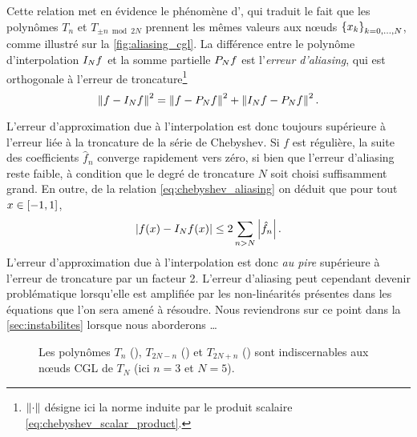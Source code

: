 Cette relation met en évidence le phénomène d', qui traduit le fait que les polynômes $T_n$ et $T_{\pm n \bmod{2N}}$ prennent les mêmes valeurs aux n\oe uds $\family{x}{k}{0}{N}$, comme illustré sur la \autoref{fig:aliasing_cgl}.
La différence entre le polynôme d'interpolation $\interpolant{f}{N}$ et la somme partielle $\truncseries{f}{N}$ est l'\textit{erreur d'aliasing}, qui est orthogonale à l'erreur de troncature\footnote{$\normtwo{\cdot}$ désigne ici la norme induite par le produit scalaire \eqref{eq:chebyshev_scalar_product}.}
\begin{equation}
	\normtwo{f - \interpolant{f}{N}}^2 = 
	\normtwo{f - \truncseries{f}{N}}^2 + 
	\normtwo{\interpolant{f}{N} - \truncseries{f}{N}}^2.
	\label{eq:chebyshev_aliasing_esrror}
\end{equation}

L'erreur d'approximation due à l'interpolation est donc toujours supérieure à l'erreur liée à la troncature de la série de Chebyshev.
Si $f$ est régulière, la suite des coefficients $\hat{f}_n$ converge rapidement vers zéro, si bien que l'erreur d'aliasing reste faible, à condition que le degré de troncature $N$ soit choisi suffisamment grand.
En outre, de la relation \eqref{eq:chebyshev_aliasing} on déduit que pour tout $x \in \chebinterval$,
\begin{equation}
	\left| f(x) - \interpolant{f}{N}(x) \right| \leq 2 \sum_{n>N} \left| \hat{f}_n \right|.
\end{equation}
L'erreur d'approximation due à l'interpolation est donc \textit{au pire} supérieure à l'erreur de troncature par un facteur 2.
L'erreur d'aliasing peut cependant devenir problématique lorsqu'elle est amplifiée par les non-linéarités présentes dans les équations que l'on sera amené à résoudre. 
Nous reviendrons sur ce point dans la \autoref{sec:instabilites} lorsque nous aborderons \ldots


\begin{figure}
	\centering
	\caption{Les polynômes $T_n$ (\protect{}), $T_{2N - n}$ (\protect{}) et $T_{2N + n}$ (\protect{}) sont indiscernables aux n\oe uds CGL de $T_N$ (ici $n = 3$ et $N = 5$).}
	\label{fig:aliasing_cgl}
\end{figure}


